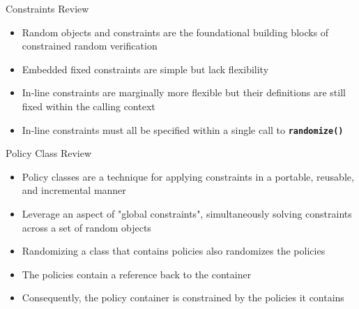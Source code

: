 \documentclass[aspectratio=169]{beamer}
\newcommand{\code}[1]{
  \textbf{\texttt{#1}}
}
\begin{document}
\begin{frame}
\end{frame}

\begin{frame}{Constraints Review}
  \begin{itemize}
    \setlength\itemsep{1em}
    \item Random objects and constraints are the foundational building blocks of constrained random verification
    \item Embedded fixed constraints are simple but lack flexibility
    \item In-line constraints are marginally more flexible but their definitions are still fixed within the calling context
    \item In-line constraints must all be specified within a single call to \code{randomize()} 
  \end{itemize}
\end{frame}

\begin{frame}{Policy Class Review}
  \begin{itemize}
    \setlength\itemsep{1em}
    \item Policy classes are a technique for applying constraints in a portable, reusable, and incremental manner
    \item Leverage an aspect of "global constraints", simultaneously solving constraints across a set of random objects
    \item Randomizing a class that contains policies also randomizes the policies
    \item The policies contain a reference back to the container
    \item Consequently, the policy container is constrained by the policies it contains
  \end{itemize}
\end{frame}
\end{document}
